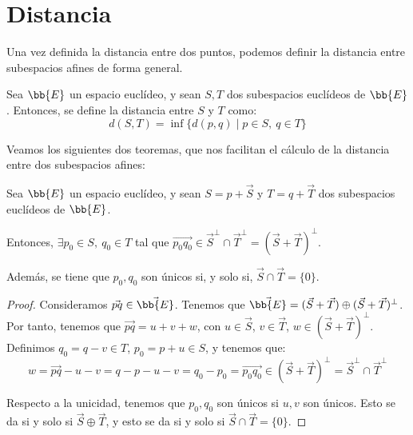 \section{Distancia}

Una vez definida la distancia entre dos puntos, podemos definir la distancia entre subespacios afines de forma general.
\begin{definicion}
    Sea $\bb{E}$ un espacio euclídeo, y sean $S,T$ dos subespacios euclídeos de $\bb{E}$. Entonces, se define la distancia entre $S$ y $T$ como:
    \begin{equation*}
        d(S,T) = \inf\{d(p,q)\mid p\in S,~q\in T\}
    \end{equation*}
\end{definicion}

Veamos los siguientes dos teoremas, que nos facilitan el cálculo de la distancia entre dos subespacios afines:
\begin{teo}\label{teo:existencia_vector_ortogonal}
    Sea $\bb{E}$ un espacio euclídeo, y sean $S=p+\vec{S}$ y $T=q+\vec{T}$ dos subespacios euclídeos de $\bb{E}$.

    Entonces, $\exists p_0\in S,~ q_0\in T$ tal que $\vec{p_0q_0}\in \vec{S}^\perp\cap \vec{T}^\perp = (\vec{S} + \vec{T})^\perp$.


    Además, se tiene que $p_0,q_0$ son únicos si, y solo si, $\vec{S}\cap \vec{T}=\{0\}$.
\end{teo}
\begin{proof}
    Consideramos $\vec{pq}\in \vec{\bb{E}}$. Tenemos que $\vec{\bb{E}}=(\vec{S}+\vec{T}) \oplus (\vec{S}+\vec{T})^\perp$. Por tanto, tenemos que $\vec{pq}=u+v+w$, con $u\in \vec{S}$, $v\in \vec{T}$, $w\in (\vec{S}+\vec{T})^\perp$. Definimos $q_0=q-v\in T$, $p_0= p+u\in S$, y tenemos que:
    \begin{equation*}
        w = \vec{pq} - u -v = q-p-u-v=q_0-p_0=\vec{p_0q_0} \in (\vec{S} + \vec{T})^\perp = \vec{S}^\perp\cap \vec{T}^\perp
    \end{equation*}

    Respecto a la unicidad, tenemos que $p_0, q_0$ son únicos si $u,v$ son únicos. Esto se da si y solo si $\vec{S}\oplus \vec{T}$, y esto se da si y solo si $\vec{S}\cap \vec{T}=\{0\}$.
\end{proof}

